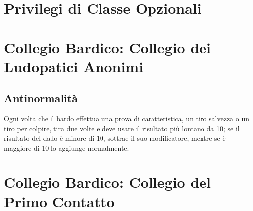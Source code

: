 
\section{Privilegi di Classe Opzionali}

\section{Collegio Bardico: Collegio dei Ludopatici Anonimi}

\subsection{Antinormalità}

Ogni volta che il bardo effettua una prova di caratteristica, un tiro salvezza o un tiro per colpire, tira due volte e deve usare il risultato più lontano da 10; se il risultato del dado è minore di 10, sottrae il suo modificatore, mentre se è maggiore di 10 lo aggiunge normalmente.

\section{Collegio Bardico: Collegio del Primo Contatto}

\begin{DndReadAloud}

\end{DndReadAloud}

\subsection{}
